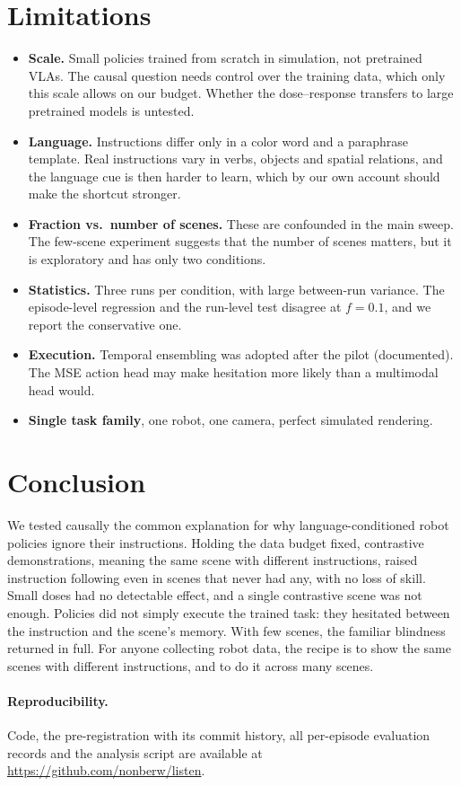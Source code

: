\documentclass[11pt]{article}
\begin{document}
\section{Limitations}
\begin{itemize}
\item \textbf{Scale.} Small policies trained from scratch in simulation, not pretrained VLAs. The
causal question needs control over the training data, which only this scale allows on our budget.
Whether the dose--response transfers to large pretrained models is untested.
\item \textbf{Language.} Instructions differ only in a color word and a paraphrase template. Real
instructions vary in verbs, objects and spatial relations, and the language cue is then harder
to learn, which by our own account should make the shortcut stronger.
\item \textbf{Fraction vs.\ number of scenes.} These are confounded in the main sweep. The
few-scene experiment suggests that the number of scenes matters, but it is exploratory and has
only two conditions.
\item \textbf{Statistics.} Three runs per condition, with large between-run variance. The
episode-level regression and the run-level test disagree at $f{=}0.1$, and we report the
conservative one.
\item \textbf{Execution.} Temporal ensembling was adopted after the pilot (documented). The MSE
action head may make hesitation more likely than a multimodal head would.
\item \textbf{Single task family}, one robot, one camera, perfect simulated rendering.
\end{itemize}

\section{Conclusion}
We tested causally the common explanation for why language-conditioned robot policies ignore
their instructions. Holding the data budget fixed, contrastive demonstrations, meaning the same
scene with different instructions, raised instruction following even in scenes that never had
any, with no loss of skill. Small doses had no detectable effect, and a single contrastive scene
was not enough. Policies did not simply execute the trained task: they hesitated between the
instruction and the scene's memory. With few scenes, the familiar blindness returned in full.
For anyone collecting robot data, the recipe is to show the same scenes with different
instructions, and to do it across many scenes.

\paragraph{Reproducibility.}
Code, the pre-registration with its commit history, all per-episode evaluation records and the
analysis script are available at \url{https://github.com/nonberw/listen}.



\end{document}
